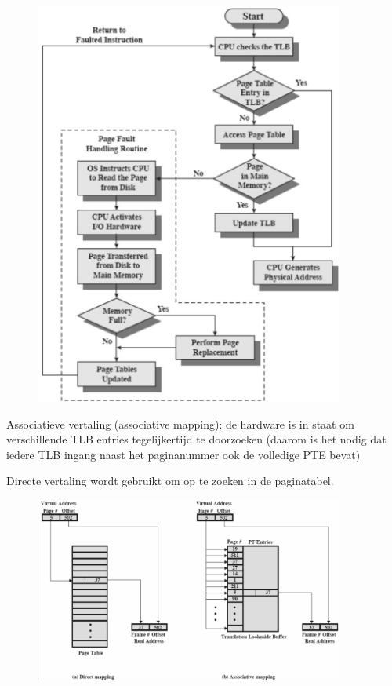 \begin{figure}[htp]
    \centering
            \includegraphics[width=4in]{img/tlb2}
        \caption{}
    \label{fig:}
\end{figure}

Associatieve vertaling (associative mapping): de hardware is in staat om verschillende TLB entries tegelijkertijd te doorzoeken (daarom is het nodig dat iedere TLB ingang naast het paginanummer ook de volledige PTE bevat)

Directe vertaling wordt gebruikt om op te zoeken in de paginatabel.

\begin{figure}[htp]
    \centering
            \includegraphics[width=4in]{img/mapping}
        \caption{}
    \label{fig:}
\end{figure}

